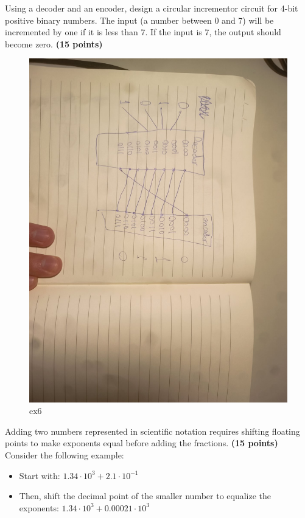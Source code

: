 \documentclass[10pt,answers]{exam}
\newcommand{\qpoints}[1]{\hfill \textbf{(#1 points)}}
\begin{document}
\begin{questions}
\question Using a decoder and an encoder, design a circular incrementor circuit for 4-bit positive binary numbers. The input (a number between 0 and 7) will be incremented by one if it is less than 7. If the input is 7, the output should become zero. \qpoints{15}
\begin{solution}
	\begin{figure}[H]
		\centering
		\includegraphics[width=\textwidth]{ex6.png}
		\caption{ex6}
    	\label{fig:ex6}
	\end{figure}
\end{solution}


\question Adding two numbers represented in scientific notation requires shifting floating points to make exponents equal before adding the fractions. \qpoints{15}
\\
Consider the following example:
\begin{itemize}
    \item Start with: $1.34 \cdot 10^3 + 2.1 \cdot 10^{-1}$
    \item Then, shift the decimal point of the smaller number to equalize the exponents:  
\(1.34 \cdot 10^3 + 0.00021 \cdot 10^3\)


\end{itemize}
\end{questions}
\end{document}
